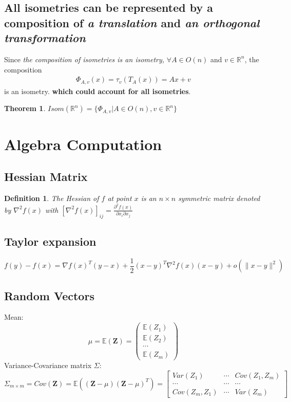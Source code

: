 \documentclass[11pt,a4paper]{article}
\newtheorem{theorem}{Theorem}
\newtheorem{definition}{Definition}
\begin{document}
\subsection{All isometries can be represented by a composition of \textit{a translation} and \textit{an orthogonal transformation}}
Since \textit{the composition of isometries is an isometry,} $\forall A\in O(n)$ and $v\in \mathbb{R}^n$, the composition
\begin{equation}
    \begin{aligned}
        \Phi_{A,v}(x)=\tau_v(T_A(x))=Ax+v
    \end{aligned}
    \nonumber
\end{equation}
is an isometry. \textbf{which could account for all isometries}.
\begin{theorem}
$Isom(\mathbb{R}^n)=\{\Phi_{A,v}|A\in O(n), v\in \mathbb{R}^n \}$
\end{theorem}

\section{Algebra Computation}
\subsection{Hessian Matrix}
\begin{definition}
    The Hessian of $f$ at point $x$ is an $n\times n$ symmetric matrix denoted by $\nabla^2 f(x)$ with $[\nabla^2 f(x)]_{ij}=\frac{\partial^2 f(x)}{\partial x_i\partial x_j}$
\end{definition}

\subsection{Taylor expansion}
$$f(y)-f(x)=\nabla f(x)^T(y-x)+\frac{1}{2}(x-y)^T \nabla^2 f(x)(x-y)+o(\|x-y\|^2)$$
\subsection{ Random Vectors}
Mean:
$$\mu =\mathbb{E}(\mathbf{Z})=\begin{pmatrix}
    \mathbb{E}(Z_1)\\
    \mathbb{E}(Z_2)\\
    \cdots\\
    \mathbb{E}(Z_m)
\end{pmatrix}$$
Variance-Covariance matrix $\Sigma$:
$$\Sigma_{m\times m}=Cov(\mathbf{Z})=\mathbb{E}((\mathbf{Z}-\mu)(\mathbf{Z}-\mu)^T)=\begin{bmatrix}
    Var(Z_1)&\cdots	&Cov(Z_1,Z_m)\\
    \cdots&\cdots	&\cdots\\
    Cov(Z_m,Z_1)&\cdots &Var(Z_m)
\end{bmatrix}$$
\end{document}
